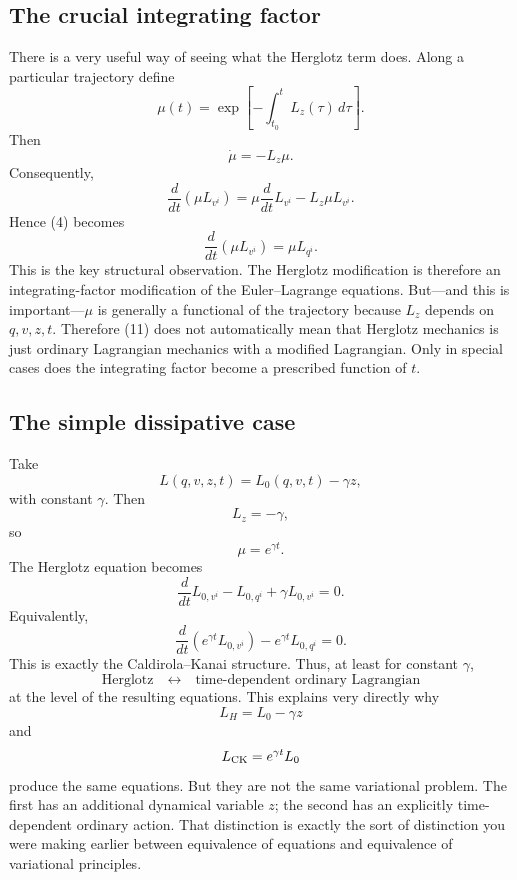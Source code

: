 \subsection{The crucial integrating factor}

There is a very useful way of seeing what the Herglotz term does.
Along a particular trajectory define
\begin{equation}
 \mu(t) = \exp\left[-\int_{t_0}^{t}L_z(\tau)\,d\tau\right]. \tag{9} 
\end{equation}
Then
\begin{equation}
 \dot\mu=-L_z\mu. \tag{10} 
\end{equation}
Consequently,
$$ \frac d{dt}(\mu L_{v^i}) = \mu\frac d{dt}L_{v^i} -L_z\mu L_{v^i}. $$
Hence (4) becomes
\begin{equation}
 \boxed{ \frac d{dt}(\mu L_{v^i}) = \mu L_{q^i}. } \tag{11} 
\end{equation}
This is the key structural observation.
The Herglotz modification is therefore an integrating-factor modification of the Euler–Lagrange equations.
But—and this is important—\(\mu\) is generally a functional of the trajectory because \(L_z\) depends on \(q,v,z,t\). Therefore (11) does not automatically mean that Herglotz mechanics is just ordinary Lagrangian mechanics with a modified Lagrangian.
Only in special cases does the integrating factor become a prescribed function of \(t\).

\subsection{The simple dissipative case}

Take
\begin{equation}
 L(q,v,z,t) = L_0(q,v,t)-\gamma z, \tag{12} 
\end{equation}
with constant \(\gamma\).
Then
$$ L_z=-\gamma, $$
so
$$ \mu=e^{\gamma t}. $$
The Herglotz equation becomes
\begin{equation}
 \frac d{dt}L_{0,v^i} -L_{0,q^i} +\gamma L_{0,v^i}=0. \tag{13} 
\end{equation}
Equivalently,
\begin{equation}
 \boxed{ \frac d{dt} \left(e^{\gamma t}L_{0,v^i}\right) - e^{\gamma t}L_{0,q^i}=0. } \tag{14} 
\end{equation}
This is exactly the Caldirola–Kanai structure.
Thus, at least for constant \(\gamma\),
$$ \boxed{ \text{Herglotz} \quad\longleftrightarrow\quad \text{time-dependent ordinary Lagrangian} } $$
at the level of the resulting equations.
This explains very directly why
$$ L_H=L_0-\gamma z $$
and
$$ L_{\rm CK}=e^{\gamma t}L_0 $$
produce the same equations.
But they are not the same variational problem. The first has an additional dynamical variable \(z\); the second has an explicitly time-dependent ordinary action.
That distinction is exactly the sort of distinction you were making earlier between equivalence of equations and equivalence of variational principles.

